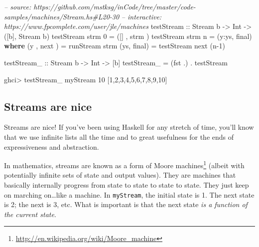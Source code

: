\documentclass[]{article}
\newenvironment{Shaded}{}{}
\newcommand{\KeywordTok}[1]{\textcolor[rgb]{0.00,0.44,0.13}{\textbf{{#1}}}}
\newcommand{\DataTypeTok}[1]{\textcolor[rgb]{0.56,0.13,0.00}{{#1}}}
\newcommand{\DecValTok}[1]{\textcolor[rgb]{0.25,0.63,0.44}{{#1}}}
\newcommand{\CommentTok}[1]{\textcolor[rgb]{0.38,0.63,0.69}{\textit{{#1}}}}
\newcommand{\OtherTok}[1]{\textcolor[rgb]{0.00,0.44,0.13}{{#1}}}
\newcommand{\FunctionTok}[1]{\textcolor[rgb]{0.02,0.16,0.49}{{#1}}}
\newcommand{\NormalTok}[1]{{#1}}
\renewcommand{\href}[2]{#2\footnote{\url{#1}}}
\begin{document}
\begin{Shaded}
\begin{Highlighting}[]
\CommentTok{-- source: https://github.com/mstksg/inCode/tree/master/code-samples/machines/Stream.hs#L20-30}
\CommentTok{-- interactive: https://www.fpcomplete.com/user/jle/machines}
\OtherTok{testStream ::} \DataTypeTok{Stream} \NormalTok{b }\OtherTok{->} \DataTypeTok{Int} \OtherTok{->} \NormalTok{([b], }\DataTypeTok{Stream} \NormalTok{b)}
\NormalTok{testStream strm }\DecValTok{0} \FunctionTok{=} \NormalTok{([]  , strm )}
\NormalTok{testStream strm n }\FunctionTok{=} \NormalTok{(y}\FunctionTok{:}\NormalTok{ys, final)}
  \KeywordTok{where}
    \NormalTok{(y , next )   }\FunctionTok{=} \NormalTok{runStream  strm}
    \NormalTok{(ys, final)   }\FunctionTok{=} \NormalTok{testStream next (n}\FunctionTok{-}\DecValTok{1}\NormalTok{)}

\OtherTok{testStream_ ::} \DataTypeTok{Stream} \NormalTok{b }\OtherTok{->} \DataTypeTok{Int} \OtherTok{->} \NormalTok{[b]}
\NormalTok{testStream_ }\FunctionTok{=} \NormalTok{(fst }\FunctionTok{.}\NormalTok{) }\FunctionTok{.} \NormalTok{testStream}
\end{Highlighting}
\end{Shaded}

\begin{Shaded}
\begin{Highlighting}[]
\NormalTok{ghci}\FunctionTok{>} \NormalTok{testStream_ myStream }\DecValTok{10}
\NormalTok{[}\DecValTok{1}\NormalTok{,}\DecValTok{2}\NormalTok{,}\DecValTok{3}\NormalTok{,}\DecValTok{4}\NormalTok{,}\DecValTok{5}\NormalTok{,}\DecValTok{6}\NormalTok{,}\DecValTok{7}\NormalTok{,}\DecValTok{8}\NormalTok{,}\DecValTok{9}\NormalTok{,}\DecValTok{10}\NormalTok{]}
\end{Highlighting}
\end{Shaded}

\subsection{Streams are nice}\label{streams-are-nice}

Streams are nice! If you've been using Haskell for any stretch of time, you'll
know that we use infinite lists all the time and to great usefulness for the
ends of expressiveness and abstraction.

In mathematics, streams are known as a form of
\href{http://en.wikipedia.org/wiki/Moore_machine}{Moore machines} (albeit with
potentially infinite sets of state and output values). They are machines that
basically internally progress from state to state to state to state. They just
keep on marching on\ldots{}like a machine. In \texttt{myStream}, the initial
state is 1. The next state is 2; the next is 3, etc. What is important is that
the next state \emph{is a function of the current state}.
\end{document}
